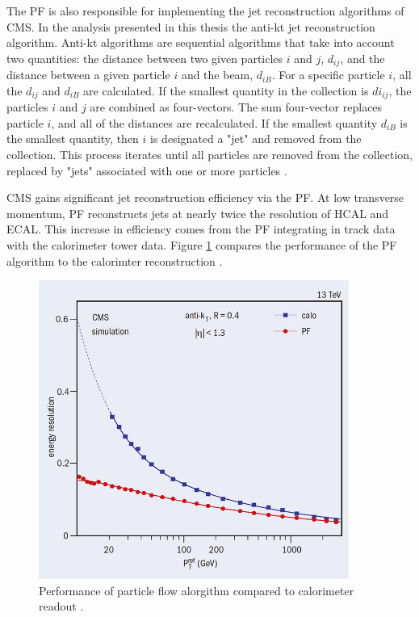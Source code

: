 The PF is also responsible for implementing the jet reconstruction algorithms of CMS. In the analysis presented in this thesis the anti-kt jet reconstruction algorithm. Anti-kt algorithms are sequential algorithms that take into account two quantities: the distance between two given particles $i$ and $j$, $d_{ij}$, and the distance between a given particle $i$ and the beam, $d_{iB}$. For a specific particle $i$, all the $d_{ij}$ and $d_{iB}$ are calculated. If the smallest quantity in the collection is $di_{ij}$, the particles $i$ and $j$ are combined as four-vectors. The sum four-vector replaces particle $i$, and all of the distances are recalculated. If the smallest quantity $d_{iB}$ is the smallest quantity, then $i$ is designated a "jet" and removed from the collection. This process iterates until all particles are removed from the collection, replaced by "jets" associated with one or more particles \cite{Ellis:1993tq}.

CMS gains significant jet reconstruction efficiency via the PF. At low transverse momentum, PF reconstructs jets at nearly twice the resolution of HCAL and ECAL. This increase in efficiency comes from the PF integrating in track data with the calorimeter tower data. Figure \ref{fig:pfPerf} compares the performance of the PF algorithm to the calorimter reconstruction \cite{Sirunyan:2017ulk}.

\begin{figure}[]
\begin{centering}
\includegraphics[width=4in]{Chapter3/importfigs/CCrec2_05_16.jpg}
\par\end{centering}
\caption{Performance of particle flow alorgithm compared to calorimeter readout \cite{Sirunyan:2017ulk}. \label{fig:pfPerf}}
\end{figure}

